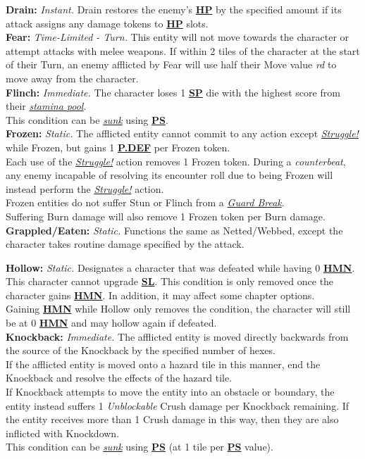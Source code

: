 \documentclass[12pt]{article}
\newcommand{\refto}[1]{\hyperlink{#1}{\textbf{#1}}}
\newcommand{\reftoit}[1]{\hyperlink{#1}{\emph{#1}}}
\begin{document}
\begin{multicols*}{2}
\textbf{Drain:} \emph{Instant.} Drain restores the enemy’s \refto{HP} by the specified amount if its attack assigns any damage tokens to \refto{HP} slots. \\

\textbf{Fear:} \emph{Time-Limited - Turn.} This entity will not move towards the character or attempt attacks with melee weapons. If within 2 tiles of the character at the start of their Turn, an enemy afflicted by Fear will use half their Move value \emph{rd} to move away from the character.\\

\textbf{Flinch:} \emph{Immediate.} The character loses 1 \refto{SP} die with the highest score from their \reftoit{stamina pool}.\\
This condition can be \reftoit{sunk} using \refto{PS}.\\

\textbf{Frozen:} \emph{Static.} The afflicted entity cannot commit to any action except \reftoit{Struggle!} while Frozen, but gains 1 \refto{P.DEF} per Frozen token.\\
Each use of the \reftoit{Struggle!} action removes 1 Frozen token. During a \emph{counterbeat}, any enemy incapable of resolving its encounter roll due to being Frozen will instead perform the \reftoit{Struggle!} action.\\
Frozen entities do not suffer Stun or Flinch from a \reftoit{Guard Break}.\\
Suffering Burn damage will also remove 1 Frozen token per Burn damage.\\

\textbf{Grappled/Eaten:} \emph{Static.} Functions the same as Netted/Webbed, except the character takes routine damage specified by the attack.

\textbf{Hollow:} \emph{Static.} Designates a character that was defeated while having 0 \refto{HMN}. This character cannot upgrade \refto{SL}. This condition is only removed once the character gains \refto{HMN}. In addition, it may affect some chapter options.\\
Gaining \refto{HMN} while Hollow only removes the condition, the character will still be at 0 \refto{HMN} and may hollow again if defeated.\\

\textbf{Knockback:} \emph{Immediate.} The afflicted entity is moved directly backwards from the source of the Knockback by the specified number of hexes.\\
If the afflicted entity is moved onto a hazard tile in this manner, end the Knockback and resolve the effects of the hazard tile.\\
If Knockback attempts to move the entity into an obstacle or boundary, the entity instead suffers 1 \emph{Unblockable} Crush damage per Knockback remaining. If the entity receives more than 1 Crush damage in this way, then they are also inflicted with Knockdown.\\
This condition can be \reftoit{sunk} using \refto{PS} (at 1 tile per \refto{PS} value).


\end{multicols*}
\end{document}
